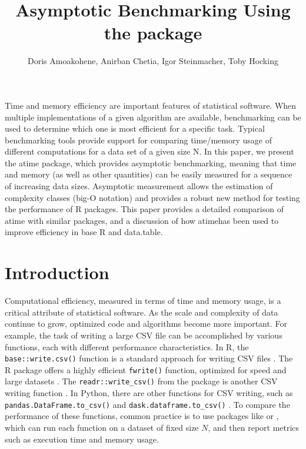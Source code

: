 \title{Asymptotic Benchmarking Using the  package}
\author{Doris Amoakohene, Anirban Chetia, Igor Steinmacher, Toby Hocking}

\maketitle

\abstract{}
Time and memory efficiency are important features of statistical software.
When multiple implementations of a given algorithm are available, benchmarking can be used to determine which one is most efficient for a specific task.
Typical benchmarking tools provide support for comparing time/memory usage of different computations for a data set of a given size N.
In this paper, we present the atime package, which provides asymptotic benchmarking, meaning that time and memory (as well as other quantities) can be easily measured for a sequence of increasing data sizes. 
Asymptotic measurement allows the estimation of complexity classes (big-O notation) and provides a robust new method for testing the performance of R packages.
This paper provides a detailed comparison of atime with similar packages, and a discussion of how atimehas been used to improve efficiency in base R and data.table. 

\section{Introduction}

Computational efficiency, measured in terms of time and memory usage, is a critical attribute of statistical software. As the scale and complexity of data continue to grow, optimized code and algorithms become more important.
For example, the task of writing a large CSV file can be accomplished by various functions, each with different performance characteristics. 
In R, the \texttt{base::write.csv()} function is a standard approach for writing CSV files \citep{baseR}.
The R package  offers a highly efficient \texttt{fwrite()} function, optimized for speed and large datasets \citep{data.table}. 
The \texttt{readr::write\_csv()} from the  package is another CSV writing function \citep{readr}.
In Python, there are other functions for CSV writing, such as \texttt{pandas.DataFrame.to\_csv()} and \texttt{dask.dataframe.to\_csv()}  \citep{pandas, dask}.
To compare the performance of these functions, common practice is to use packages like  \citep{microbenchmark} or  \citep{bench}, which can run each function on a dataset of fixed size $N$, and then report metrics such as execution time and memory usage.

